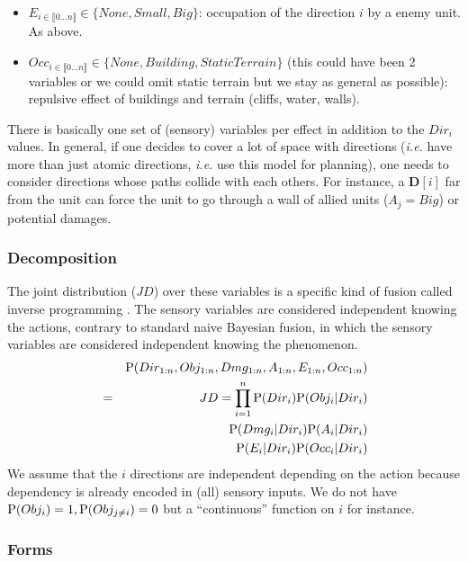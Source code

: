 \begin{itemize}
\item $E_{i \in \llbracket 0 \dots n\rrbracket } \in \{None, Small, Big\}$: occupation of the direction $i$ by a enemy unit. As above.
\item $Occ_{i \in \llbracket 0 \dots n\rrbracket } \in \{None, Building, StaticTerrain\}$ (this could have been 2 variables or we could omit static terrain but we stay as general as possible): repulsive effect of buildings and terrain (cliffs, water, walls).
\end{itemize}
There is basically one set of (sensory) variables per effect in addition to the $Dir_i$ values. 
In general, if one decides to cover a lot of space with directions (\textit{i.e.} have more than just atomic directions, \textit{i.e.} use this model for planning), one needs to consider directions whose paths collide with each others. For instance, a $\mathbf{D}[i]$ far from the unit can force the unit to go through a wall of allied units ($A_j = Big$) or potential damages.

\subsubsection{Decomposition}

The joint distribution ($JD$) over these variables is a specific kind of fusion called inverse programming \citep{LeHy04}. The sensory variables are considered independent knowing the actions, contrary to standard naive Bayesian fusion, in which the sensory variables are considered independent knowing the phenomenon.
\begin{eqnarray}
&& \mathrm{P}(Dir_{1:n}, Obj_{1:n}, Dmg_{1:n}, A_{1:n}, E_{1:n}, Occ_{1:n})\\
& = & JD = \prod_{i=1}^{n} \mathrm{P}(Dir_i) \mathrm{P}(Obj_i | Dir_i) \\
                    && \mathrm{P}(Dmg_i | Dir_i) \mathrm{P}(A_i | Dir_i) \\
                    && \mathrm{P}(E_i | Dir_i) \mathrm{P}(Occ_i | Dir_i)
\end{eqnarray}
We assume that the $i$ directions are independent depending on the action because dependency is already encoded in (all) sensory inputs. We do not have $\mathrm{P}(Obj_i) = 1, \mathrm{P}(Obj_{j\neq i}) = 0$ but a ``continuous'' function on $i$ for instance.

\subsubsection{Forms}

